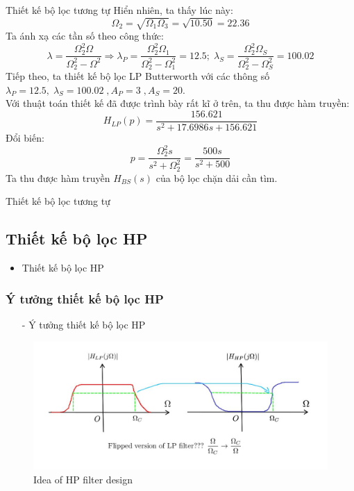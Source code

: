 \documentclass[8pt]{beamer}
\begin{document}
\begin{frame}{Thiết kế bộ lọc tương tự}
Hiển nhiên, ta thấy lúc này: $$\Omega_{2}=\sqrt{\Omega_{1}\Omega_{3}}=\sqrt{10.50}=22.36$$ Ta ánh xạ các tần số theo công thức:
$$\lambda=\frac{\Omega_{2}^2\Omega}{\Omega_{2}^2-\Omega^2}\Rightarrow \lambda_{P}=\frac{\Omega_{2}^2\Omega_{1}}{\Omega_{2}^2-\Omega_{1}^2}=12.5;\;\lambda_{S}=\frac{\Omega_{2}^2\Omega_{S}}{\Omega_{2}^2-\Omega_{S}^2}=100.02$$
Tiếp theo, ta thiết kế bộ lọc LP Butterworth  với các thông số $\lambda_{P}=12.5,\;\lambda_{S}=100.02\; ,A_{P}=3\; ,A_{S}=20$. \\Với thuật toán thiết kế đã được trình bày rất kĩ ở trên, ta thu được hàm truyền:
$$H_{LP}(p)=\frac{156.621}{s^2+17.6986s+156.621}$$
Đổi biến: 
$$p=\frac{\Omega_{2}^2s}{s^2+\Omega_{2}^2}=\frac{500s}{s^2+500}$$
Ta thu được hàm truyền $H_{BS}(s)$ của bộ lọc chặn dải cần tìm.
\end{frame}
\begin{frame}{Thiết kế bộ lọc tương tự}
\subsection{Thiết kế bộ lọc HP}
\begin{itemize}
	\item Thiết kế bộ lọc HP
\end{itemize}
\subsubsection{Ý tưởng thiết kế bộ lọc HP}
\begin{itemize}
	\item[-] Ý tưởng thiết kế bộ lọc HP
\end{itemize}
\begin{figure}[h]
	\includegraphics[width=1\textwidth]{23.jpg}
	\caption{Idea of HP filter design}			\label{fig:re2}
		\end{figure}

\end{frame}
\end{document}
